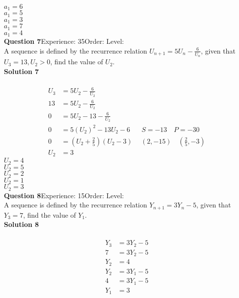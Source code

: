 \documentclass{article}
\begin{document}
$a_1=6$\\
$a_1=5$\\
$a_1=3$\\
$a_1=7$\\
$a_1=4$\\
\noindent\textbf{Question 7}\hspace{20pt}Experience: 35\hspace{20pt}Order: \hspace{20pt}Level: \\[2pt]
A sequence is defined by the recurrence relation $U_{n+1}=5U_n-\displaystyle\frac{6}{U_n}$, given that  $U_3 =13, U_2 > 0$, find the value of $U_2$.\\[4pt]
\noindent\textbf{Solution 7}\\[2pt]
\\[-10pt]\begin{align*}
U_3&=5U_2-\displaystyle\frac{6}{U_2}\\[2pt]
13&=5U_2-\displaystyle\frac{6}{U_2}\\[2pt]
0&=5U_2-13 -\displaystyle\frac{6}{U_2}\\[2pt]
0&=5(U_2)^2-13U_2 -6\hspace{20pt}S=-13\quad P=-30\\[2pt]
0&=\left(U_2+\displaystyle\frac{2}{5}\right)(U_2-3)\hspace{15pt}(2,-15)\quad \left(\displaystyle\frac{2}{5},-3\right)\\[2pt]
U_2&=3
\end{align*}
$U_2=4$\\
$U_2=5$\\
$U_2=2$\\
$U_2=1$\\
$U_2=3$\\
\noindent\textbf{Question 8}\hspace{20pt}Experience: 15\hspace{20pt}Order: \hspace{20pt}Level: \\[2pt]
A sequence is defined by the recurrence relation $Y_{n+1}=3Y_n-5$, given that  $Y_3 =7$, find the value of $Y_1$.\\[4pt]
\noindent\textbf{Solution 8}\\[2pt]
\\[-10pt]\begin{align*}
Y_3&=3Y_2-5\\[2pt]
7&=3Y_2-5\\[2pt]
Y_2&=4\\[12pt]
Y_2&=3Y_1-5\\[2pt]
4&=3Y_1-5\\[2pt]
Y_1&=3\\
\end{align*}
\end{document}
